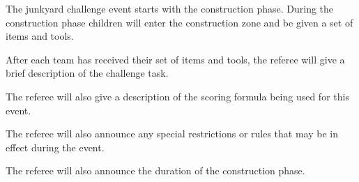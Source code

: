 \documentclass[12pt]{hurocup}
\begin{document}
\label{law-game-play}

\begin{lawlist}[JC]

\item The junkyard challenge event starts with the construction
  phase. During the construction phase children will enter the
  construction zone and be given a set of items and tools.

\item \label{g-task} After each team has received their set of items
  and tools, the referee will give a brief description of the
  challenge task.

\item \label{g-score} The referee will also give a description of the
  scoring formula being used for this event.

\item \label{g-rule} The referee will also announce any special
  restrictions or rules that may be in effect during the event.

\item \label{g-duration} The referee will also announce the duration
  of the construction phase.

\end{lawlist}
\end{document}
